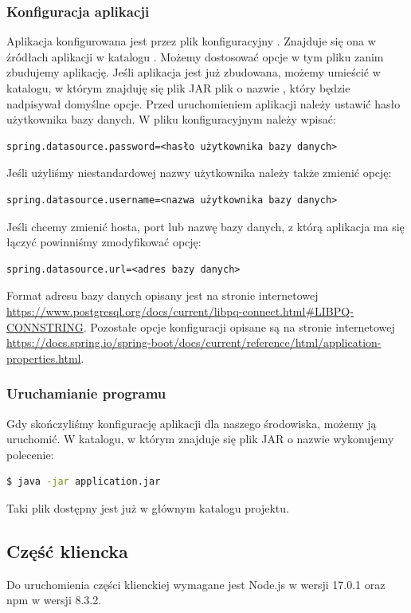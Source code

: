 \documentclass[shortabstract,inz]{iithesis}
\begin{document}
\subsubsection*{Konfiguracja aplikacji}
Aplikacja konfigurowana jest przez plik konfiguracyjny . Znajduje się ona w źródłach aplikacji w katalogu . Możemy dostosować opcje w tym pliku zanim zbudujemy aplikację. Jeśli aplikacja jest już zbudowana, możemy umieścić w katalogu, w którym znajduję się plik JAR plik o nazwie , który będzie nadpisywał domyślne opcje. 
Przed uruchomieniem aplikacji należy ustawić hasło użytkownika bazy danych. W pliku konfiguracyjnym należy wpisać:
   \begin{lstlisting}
spring.datasource.password=<hasło użytkownika bazy danych>
	\end{lstlisting}
Jeśli użyliśmy niestandardowej nazwy użytkownika należy także zmienić opcję:
	\begin{lstlisting}
spring.datasource.username=<nazwa użytkownika bazy danych>
	\end{lstlisting}
Jeśli chcemy zmienić hosta, port lub nazwę bazy danych, z którą aplikacja ma się łączyć powinniśmy zmodyfikować opcję:
	\begin{lstlisting}
spring.datasource.url=<adres bazy danych>
	\end{lstlisting}
Format adresu bazy danych opisany jest na stronie internetowej \url{https://www.postgresql.org/docs/current/libpq-connect.html#LIBPQ-CONNSTRING}.
Pozostałe opcje konfiguracji opisane są na stronie internetowej \url{https://docs.spring.io/spring-boot/docs/current/reference/html/application-properties.html}.

\subsubsection{Uruchamianie programu}
Gdy skończyliśmy konfigurację aplikacji dla naszego środowiska, możemy ją uruchomić. 
\noindend W katalogu, w którym znajduje się plik JAR o nazwie  wykonujemy polecenie:
\begin{lstlisting}[language=bash]
  $ java -jar application.jar
\end{lstlisting}
Taki plik dostępny jest już w głównym katalogu projektu.

\subsection*{Część kliencka}
Do uruchomienia części klienckiej wymagane jest Node.js \citep{nodejs} w wersji 17.0.1 oraz npm \citep{npm} w wersji 8.3.2.
\end{document}

